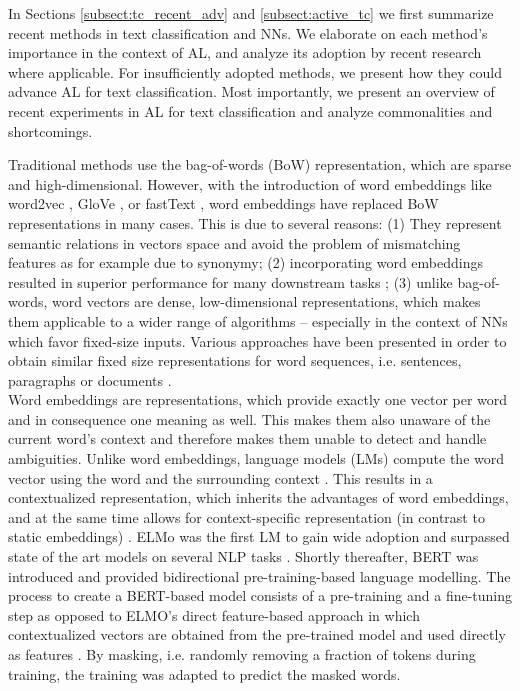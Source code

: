 \label{sect:text_classification}
In Sections \ref{subsect:tc_recent_adv} and \ref{subsect:active_tc} we first summarize recent methods in text classification and NNs.
We elaborate on each method's importance in the context of AL, and analyze its adoption by recent research where applicable.
For insufficiently adopted methods, we present how they could advance AL for text classification.
Most importantly, we present an overview of recent experiments in AL for text classification and analyze commonalities and shortcomings.

\label{subsect:tc_recent_adv}

Traditional methods use the bag-of-words (BoW) representation, which are sparse and high-dimensional.
However, with the introduction of word embeddings like word2vec , 
GloVe , or fastText ,
word embeddings have replaced BoW representations in many cases.
This is due to several reasons:
(1) They represent semantic relations in vectors space and avoid the problem of mismatching features as for example due to synonymy;
(2) incorporating word embeddings resulted in superior performance for many downstream tasks ;
(3) unlike bag-of-words, word vectors are dense, low-dimensional representations, 
which makes them applicable to a wider range of algorithms --
especially in the context of NNs which favor fixed-size inputs.
Various approaches have been presented in order to obtain similar fixed size representations for word sequences, i.e. sentences, paragraphs or documents .\\
\pindent Word embeddings are representations, which provide exactly one vector per word and in consequence one meaning as well.
This makes them also unaware of the current word's context and therefore makes them unable to detect and handle ambiguities.
Unlike word embeddings, language models (LMs) compute the word vector using the word and the surrounding context .
This results in a contextualized representation, which inherits the advantages of word embeddings, and at the same time allows for context-specific representation (in contrast to static embeddings) . 
ELMo was the first LM to gain wide adoption and surpassed state of the art models on several NLP tasks .
Shortly thereafter, BERT  was introduced and provided bidirectional pre-training-based language modelling.
The process to create a BERT-based model consists of a pre-training and a fine-tuning step as opposed to ELMO's direct feature-based approach in which contextualized vectors are obtained from the pre-trained model and used directly as features .
By masking, i.e. randomly removing a fraction of tokens during training, the training was adapted to predict the masked words.
